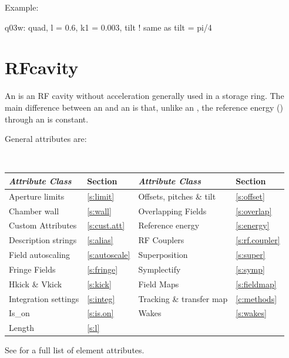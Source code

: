 {Example:
\begin{example}
  q03w: quad, l = 0.6, k1 = 0.003, tilt  ! same as tilt = pi/4
\end{example}

\section{RFcavity}
\label{s:rfcav}

An  is an RF cavity without acceleration generally used
in a storage ring. The main difference between an  and an
 is that, unlike an , the reference energy
() through an  is constant.

General  attributes are:
\begin{center}
\tt
\begin{tabular}{llll} \toprule
  {\sl Attribute Class}      & Section            & {\sl Attribute Class}      & Section            \\ \midrule
  Aperture limits            & \ref{s:limit}      & Offsets, pitches \& tilt   & \ref{s:offset}     \\
  Chamber wall               & \ref{s:wall}       & Overlapping Fields         & \ref{s:overlap}    \\
  Custom Attributes          & \ref{s:cust.att}   & Reference energy           & \ref{s:energy}     \\ 
  Description strings        & \ref{s:alias}      & RF Couplers                & \ref{s:rf.coupler} \\
  Field autoscaling          & \ref{s:autoscale}  & Superposition              & \ref{s:super}      \\
  Fringe Fields              & \ref{s:fringe}     & Symplectify                & \ref{s:symp}       \\
  Hkick \& Vkick             & \ref{s:kick}       & Field Maps                 & \ref{s:fieldmap}   \\
  Integration settings       & \ref{s:integ}      & Tracking \& transfer map   & \ref{c:methods}    \\
  Is_on                      & \ref{s:is.on}      & Wakes                      & \ref{s:wakes}      \\
  Length                     & \ref{s:l}          &                            &                    \\
  \bottomrule
\end{tabular}
\end{center}
\toffset
See  for a full list of element attributes.

}
